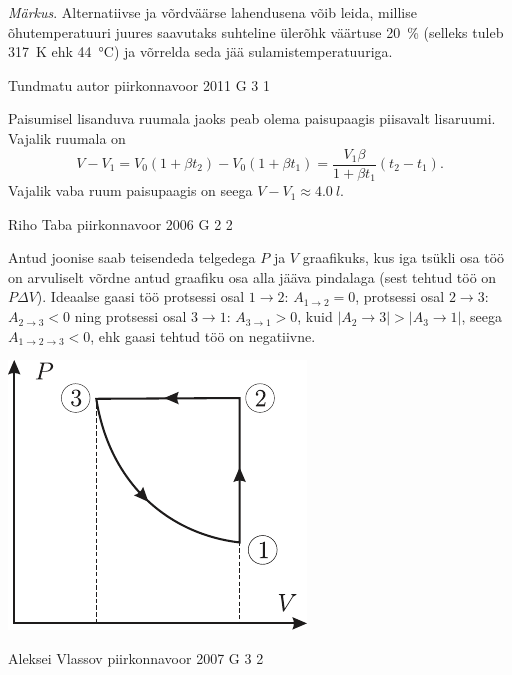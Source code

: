 \documentclass[11pt, twoside]{article}
\begin{document}
{{\emph{Märkus}. Alternatiivse ja võrdväärse lahendusena võib leida, millise õhutemperatuuri juures saavutaks suhteline ülerõhk väärtuse \SI{20}{\%} (selleks tuleb \SI{317}{K} ehk \SI{44}{\celsius}) ja võrrelda seda jää sulamistemperatuuriga.
\fi
}

{Tundmatu autor} %
{piirkonnavoor} %
{2011} %
{G 3} %
{1} %
{

\ifSolution
Paisumisel lisanduva ruumala jaoks peab olema paisupaagis piisavalt lisaruumi. Vajalik ruumala on
\[
V-V_{1}=V_{0}\left(1+\beta t_{2}\right)-V_{0}\left(1+\beta t_{1}\right)=\frac{V_{1} \beta}{1+\beta t_{1}}\left(t_{2}-t_{1}\right).
\]
Vajalik vaba ruum paisupaagis on seega $V - V_1 \approx \SI{4,0}{l}$.
\fi
}

{Riho Taba} %
{piirkonnavoor} %
{2006} %
{G 2} %
{2} %
{

\ifSolution
Antud joonise saab teisendeda telgedega $P$ ja $V$ graafikuks, kus iga tsükli osa töö on arvuliselt võrdne antud graafiku osa alla jääva pindalaga (sest tehtud töö on $P\Delta V$). Ideaalse gaasi töö protsessi osal $1 \rightarrow 2$: $A_{1\rightarrow 2} = 0$, protsessi osal $2 \rightarrow 3$: $A_{2\rightarrow 3} < 0$ ning protsessi osal $3 \rightarrow 1$: $A_{3\rightarrow 1} > 0$, kuid $|A_2\rightarrow 3| > |A_3\rightarrow 1|$, seega $A_{1\rightarrow 2\rightarrow 3} < 0$, ehk gaasi tehtud töö on negatiivne.

\begin{center}
	\includegraphics[width=0.4\linewidth]{2006-v2g-02-lah}
\end{center}
\fi
}

{Aleksei Vlassov} %
{piirkonnavoor} %
{2007} %
{G 3} %
{2} %
{

}}
\end{document}
